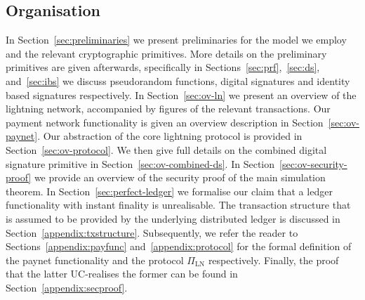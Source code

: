 \subsection{Organisation}
In Section~\ref{sec:preliminaries} we present preliminaries for the model we
employ and the relevant cryptographic primitives. More details on the
preliminary primitives are given afterwards, specifically in
Sections~\ref{sec:prf},~\ref{sec:ds}, and~\ref{sec:ibs} we discuss pseudorandom
functions, digital signatures and identity based signatures respectively. In
Section~\ref{sec:ov-ln} we present an overview of the lightning network,
accompanied by figures of the relevant transactions. Our payment network
functionality is given an overview description in Section~\ref{sec:ov-paynet}.
Our abstraction of the core lightning protocol is provided in
Section~\ref{sec:ov-protocol}. We then give full details on the combined digital
signature primitive in Section~\ref{sec:ov-combined-ds}. In
Section~\ref{sec:ov-security-proof} we provide an overview of the security proof
of the main simulation theorem. In Section~\ref{sec:perfect-ledger} we formalise
our claim that a ledger functionality with instant finality is unrealisable. The
transaction structure that is assumed to be provided by the underlying
distributed ledger is discussed in Section~\ref{appendix:txstructure}.
Subsequently, we refer the reader to Sections~\ref{appendix:payfunc}
and~\ref{appendix:protocol} for the formal definition of the paynet
functionality \fpaynet{} and the protocol $\Pi_{\mathrm{LN}}$ respectively.
Finally, the proof that the latter UC-realises the former can be found in
Section~\ref{appendix:secproof}.

